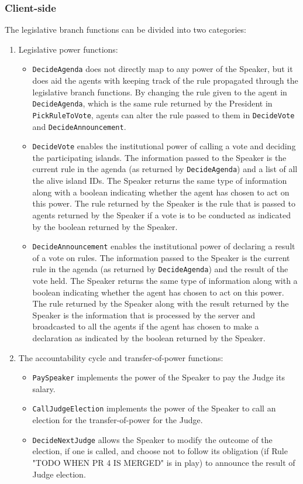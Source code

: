 \subsubsection{Client-side}
The legislative branch functions can be divided into two categories:
\begin{enumerate}
\item Legislative power functions:
    \begin{itemize}
        \item \texttt{DecideAgenda} does not directly map to any power of the Speaker, but it does aid the agents with keeping track of the rule propagated through the legislative branch functions. By changing the rule given to the agent in \texttt{DecideAgenda}, which is the same rule returned by the President in \texttt{PickRuleToVote}, agents can alter the rule passed to them in \texttt{DecideVote} and \texttt{DecideAnnouncement}.
        \item \texttt{DecideVote} enables the institutional power of calling a vote and deciding the participating islands. The information passed to the Speaker is the current rule in the agenda (as returned by \texttt{DecideAgenda}) and a list of all the alive island IDs. The Speaker returns the same type of information along with a boolean indicating whether the agent has chosen to act on this power. The rule returned by the Speaker is the rule that is passed to agents returned by the Speaker if a vote is to be conducted as indicated by the boolean returned by the Speaker.
        \item \texttt{DecideAnnouncement} enables the institutional power of declaring a result of a vote on rules. The information passed to the Speaker is the current rule in the agenda (as returned by \texttt{DecideAgenda}) and the result of the vote held. The Speaker returns the same type of information along with a boolean indicating whether the agent has chosen to act on this power. The rule returned by the Speaker along with the result returned by the Speaker is the information that is processed by the server and broadcasted to all the agents if the agent has chosen to make a declaration as indicated by the boolean returned by the Speaker.
    \end{itemize}
\item The accountability cycle and transfer-of-power functions:
    \begin{itemize}
        \item \texttt{PaySpeaker} implements the power of the Speaker to pay the Judge its salary. 
        \item \texttt{CallJudgeElection} implements the power of the Speaker to call an election for the transfer-of-power for the Judge.
        \item \texttt{DecideNextJudge} allows the Speaker to modify the outcome of the election, if one is called, and choose not to follow its obligation (if Rule "TODO WHEN PR 4 IS MERGED" is in play) to announce the result of Judge election.
    \end{itemize}
\end{enumerate}

